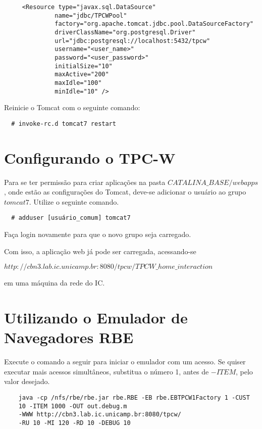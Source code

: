 \documentclass{article}
\begin{document}
\begin{verbatim}
     <Resource type="javax.sql.DataSource"
              name="jdbc/TPCWPool"
              factory="org.apache.tomcat.jdbc.pool.DataSourceFactory"
              driverClassName="org.postgresql.Driver"
              url="jdbc:postgresql://localhost:5432/tpcw"
              username="<user_name>"
              password="<user_password>"
              initialSize="10"
              maxActive="200"
              maxIdle="100"
              minIdle="10" />
\end{verbatim}
   

Reinicie o Tomcat com o seguinte comando:
\begin{verbatim}
  # invoke-rc.d tomcat7 restart   
\end{verbatim}


\section{Configurando o TPC-W}

Para se ter permissão para criar aplicações na pasta $CATALINA\_BASE/webapps$, onde estão as configurações do Tomcat, deve-se adicionar o usuário ao grupo $tomcat7$. Utilize o seguinte comando.

\begin{verbatim}
  # adduser [usuário_comum] tomcat7
\end{verbatim}

Faça login novamente para que o novo grupo seja carregado.

Com isso, a aplicação web já pode ser carregada, acessando-se

$http://cbn3.lab.ic.unicamp.br:8080/tpcw/TPCW\_home\_interaction$

em uma máquina da rede do IC.


\section{Utilizando o Emulador de Navegadores RBE}

Execute o comando a seguir para iniciar o emulador com um acesso. Se quiser executar mais acessos simultâneos, substitua o número 1, antes de $-ITEM$, pelo valor desejado.

\begin{verbatim}
    java -cp /nfs/rbe/rbe.jar rbe.RBE -EB rbe.EBTPCW1Factory 1 -CUST
    10 -ITEM 1000 -OUT out.debug.m
    -WWW http://cbn3.lab.ic.unicamp.br:8080/tpcw/
    -RU 10 -MI 120 -RD 10 -DEBUG 10


\end{verbatim}
\end{document}
